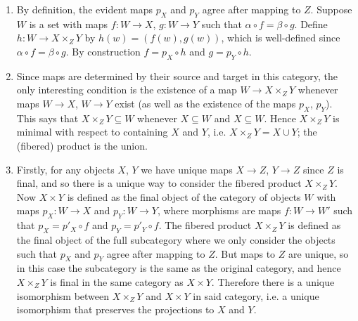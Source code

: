 \documentclass{report}
\begin{document}
\begin{enumerate}[label=\textbf{1.3.\Alph*.}]
	\item By definition, the evident maps $p_X$ and $p_Y$ agree after
	      mapping to $Z$. Suppose $W$ is a set with maps $f:W\to X$, $g:W\to Y$
	      such that $\alpha\circ f=\beta\circ g$. Define $h:W\to X\times_ZY$
	      by $h(w) = (f(w), g(w))$, which is well-defined since
	      $\alpha\circ f=\beta\circ g$. By construction $f=p_X\circ h$ and
	      $g=p_Y\circ h$.

	\item Since maps are determined by their source and target in this
	      category, the only interesting condition is the existence of a map
	      $W\to X\times_ZY$ whenever maps $W\to X$, $W\to Y$ exist (as well as
	      the existence of the maps $p_X$, $p_Y$). This says that
	      $X\times_ZY\subseteq W$ whenever $X\subseteq W$ and $X\subseteq W$.
	      Hence $X\times_ZY$ is minimal with respect to containing $X$ and $Y$,
	      i.e. $X\times_ZY=X\cup Y$; the (fibered) product is the union.

	\item Firstly, for any objects $X$, $Y$ we have unique maps $X\to Z$,
	      $Y\to Z$ since $Z$ is final, and so there is a unique way to consider
	      the fibered product $X\times_ZY$. Now $X\times Y$ is defined as the
	      final object of the category of objects $W$ with maps $p_X:W\to X$
	      and $p_Y:W\to Y$, where morphisms are maps $f:W\to W'$ such that
	      $p_X=p'_X\circ f$ and $p_Y=p'_Y\circ f$. The fibered product
	      $X\times_ZY$ is defined as the final object of the full subcategory
	      where we only consider the objects such that $p_X$ and $p_Y$ agree
	      after mapping to $Z$. But maps to $Z$ are unique, so in this case the
	      subcategory is the same as the original category, and hence
	      $X\times_ZY$ is final in the same category as $X\times Y$.
	      Therefore there is a unique isomorphism between $X\times_ZY$ and
	      $X\times Y$ in said category, i.e. a unique isomorphism that
	      preserves the projections to $X$ and $Y$.


\end{enumerate}
\end{document}
